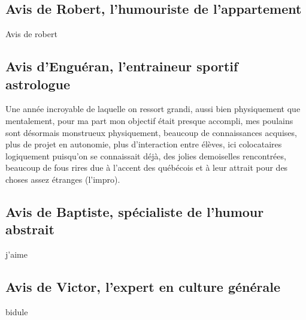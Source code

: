 \subsection{Avis de Robert, l'humouriste de l'appartement}

Avis de robert 

\subsection{Avis d'Enguéran, l'entraineur sportif astrologue}

Une année incroyable de laquelle on ressort grandi, aussi bien physiquement que mentalement, pour ma part mon objectif était presque accompli, mes poulains sont désormais monstrueux physiquement, beaucoup de connaissances acquises, plus de projet en autonomie, plus d’interaction entre élèves, ici colocataires logiquement puisqu’on se connaissait déjà, des jolies demoiselles rencontrées, beaucoup de fous rires due à l’accent des québécois et à leur attrait pour des choses assez étranges (l’impro). 

\subsection{Avis de Baptiste, spécialiste de l'humour abstrait}

j'aime

\subsection{Avis de Victor, l'expert en culture générale}

bidule
